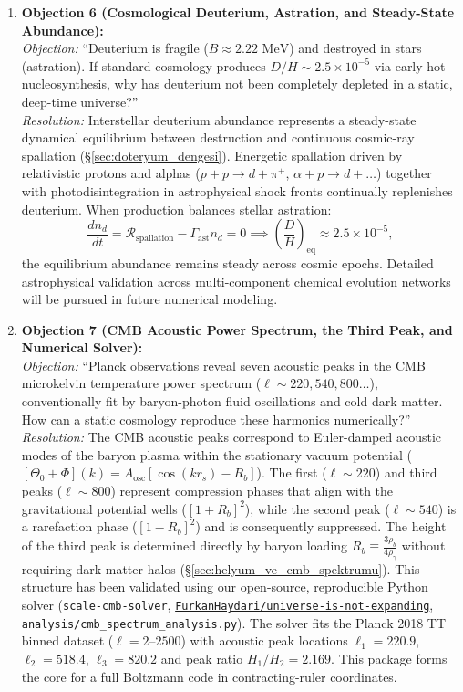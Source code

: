 \begin{enumerate}
    \item \textbf{Objection 6 (Cosmological Deuterium, Astration, and Steady-State Abundance):} \\
          \textit{Objection:} ``Deuterium is fragile ($B \approx 2.22\text{ MeV}$) and destroyed in stars (astration). If standard cosmology produces $D/H \sim 2.5 \times 10^{-5}$ via early hot nucleosynthesis, why has deuterium not been completely depleted in a static, deep-time universe?'' \\
          \textit{Resolution:} Interstellar deuterium abundance represents a steady-state dynamical equilibrium between destruction and continuous cosmic-ray spallation (\S\ref{sec:doteryum_dengesi}). Energetic spallation driven by relativistic protons and alphas ($p+p \to d+\pi^+$, $\alpha+p \to d+\dots$) together with photodisintegration in astrophysical shock fronts continually replenishes deuterium. When production balances stellar astration:
          \begin{equation}
              \frac{d n_d}{dt} = \mathcal{R}_{\mathrm{spallation}} - \Gamma_{\mathrm{ast}} n_d = 0 \implies \left( \frac{D}{H} \right)_{\mathrm{eq}} \approx 2.5 \times 10^{-5},
          \end{equation}
          the equilibrium abundance remains steady across cosmic epochs. Detailed astrophysical validation across multi-component chemical evolution networks will be pursued in future numerical modeling.

    \item \textbf{Objection 7 (CMB Acoustic Power Spectrum, the Third Peak, and Numerical Solver):} \\
          \textit{Objection:} ``Planck observations reveal seven acoustic peaks in the CMB microkelvin temperature power spectrum ($\ell \sim 220, 540, 800 \dots$), conventionally fit by baryon-photon fluid oscillations and cold dark matter. How can a static cosmology reproduce these harmonics numerically?'' \\
          \textit{Resolution:} The CMB acoustic peaks correspond to Euler-damped acoustic modes of the baryon plasma within the stationary vacuum potential ($[\Theta_0 + \Phi](k) = A_{\mathrm{osc}} [\cos(k r_s) - R_b]$). The first ($\ell \sim 220$) and third peaks ($\ell \sim 800$) represent compression phases that align with the gravitational potential wells ($[1 + R_b]^2$), while the second peak ($\ell \sim 540$) is a rarefaction phase ($[1 - R_b]^2$) and is consequently suppressed. The height of the third peak is determined directly by baryon loading $R_b \equiv \frac{3\rho_b}{4\rho_\gamma}$ without requiring dark matter halos (\S\ref{sec:helyum_ve_cmb_spektrumu}). This structure has been validated using our open-source, reproducible Python solver (\texttt{scale-cmb-solver}, \href{https://github.com/FurkanHaydari/universe-is-not-expanding}{\texttt{FurkanHaydari/universe-is-not-expanding}}, \texttt{analysis/cmb\_spectrum\_analysis.py}). The solver fits the Planck 2018 TT binned dataset ($\ell = 2$--$2500$) with acoustic peak locations $\ell_1 = 220.9$, $\ell_2 = 518.4$, $\ell_3 = 820.2$ and peak ratio $H_1/H_2 = 2.169$. This package forms the core for a full Boltzmann code in contracting-ruler coordinates.


\end{enumerate}
